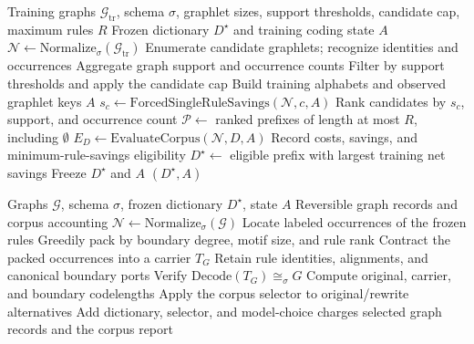 \begin{algorithm}[tbp]
\caption{Fit a graphlet dictionary on training graphs}
\label{alg:fit-graphlet-dictionary}
\small
\begin{algorithmic}[1]
\Require Training graphs $\mathcal G_{\mathrm{tr}}$, schema $\sigma$,
  graphlet sizes, support thresholds, candidate cap, maximum rules $R$
\Ensure Frozen dictionary $D^\star$ and training coding state $A$
\State $\mathcal N\gets\mathrm{Normalize}_\sigma(\mathcal G_{\mathrm{tr}})$
\State Enumerate candidate graphlets; recognize identities and occurrences
\State Aggregate graph support and occurrence counts
\State Filter by support thresholds and apply the candidate cap
\State Build training alphabets and observed graphlet keys $A$
  \State $s_c\gets\mathrm{ForcedSingleRuleSavings}(\mathcal N,c,A)$
\EndFor
\State Rank candidates by $s_c$, support, and occurrence count
\State $\mathcal P\gets$ ranked prefixes of length at most $R$, including $\emptyset$
  \State $E_D\gets\mathrm{EvaluateCorpus}(\mathcal N,D,A)$
  \State Record costs, savings, and minimum-rule-savings eligibility
\EndFor
\State $D^\star\gets$ eligible prefix with largest training net savings
\State Freeze $D^\star$ and $A$
\State \Return $(D^\star,A)$
\end{algorithmic}
\end{algorithm}

\begin{algorithm}[tbp]
\caption{Transform graphs with a frozen dictionary}
\label{alg:apply-graphlet-dictionary}
\small
\begin{algorithmic}[1]
\Require Graphs $\mathcal G$, schema $\sigma$, frozen dictionary $D^\star$, state $A$
\Ensure Reversible graph records and corpus accounting
\State $\mathcal N\gets\mathrm{Normalize}_\sigma(\mathcal G)$
  \State Locate labeled occurrences of the frozen rules
  \State Greedily pack by boundary degree, motif size, and rule rank
  \State Contract the packed occurrences into a carrier $T_G$
  \State Retain rule identities, alignments, and canonical boundary ports
    \State Verify $\mathrm{Decode}(T_G)\cong_\sigma G$
  \EndIf
  \State Compute original, carrier, and boundary codelengths
\EndFor
\State Apply the corpus selector to original/rewrite alternatives
\State Add dictionary, selector, and model-choice charges
\State \Return selected graph records and the corpus report
\end{algorithmic}
\end{algorithm}
